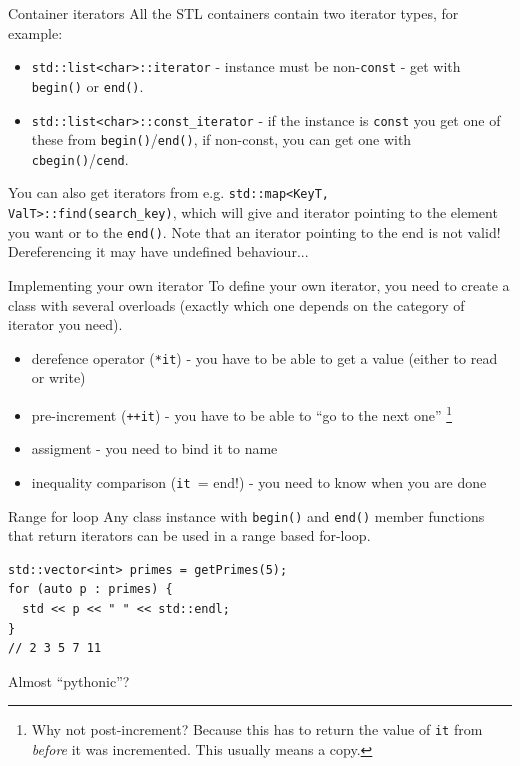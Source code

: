 \documentclass[presentation,t]{beamer}
\newcommand{\code}[1]{\lstinline!#1!}
\begin{document}
\begin{frame}{Container iterators}
  All the STL containers contain two iterator types, for example:
  \begin{itemize}
  \item \code{std::list<char>::iterator} - instance must be
    non-\code{const} - get with \code{begin()} or \code{end()}.
  \item \code{std::list<char>::const_iterator} - if the instance is
    \code{const} you get one of these from
    \code{begin()}/\code{end()}, if non-const, you can get one with \code{cbegin()}/\code{cend}.
  \end{itemize}
  \vfill
  
  You can also get iterators from e.g. \code{std::map<KeyT,
    ValT>::find(search_key)}, which will give and iterator pointing to
  the element you want or to the \code{end()}.
  \vfill
  Note that an iterator pointing to the end is not valid!
  Dereferencing it may have undefined behaviour...
\end{frame}

\begin{frame}{Implementing your own iterator}
  To define your own iterator, you need to create a class with several
  overloads (exactly which one depends on the category of iterator you
  need).
  
  \begin{itemize}
  \item derefence operator (\code{*it}) - you have to be able to get a value
    (either to read or write)
  \item pre-increment (\code{++it}) - you have to be able to ``go to
    the next one'' \footnote{Why not post-increment? Because this has
      to return the value of \code{it} from \emph{before} it was
      incremented. This usually means a copy.}
  \item assigment - you need to bind it to name
  \item inequality comparison (\code{it != end}) - you need to know
    when you are done
  \end{itemize}
\end{frame}

\begin{frame}[fragile]{Range for loop}
  Any class instance with \code{begin()} and \code{end()} member
  functions that return iterators can be used in a range based
  for-loop.
\begin{lstlisting}
std::vector<int> primes = getPrimes(5);
for (auto p : primes) {
  std << p << " " << std::endl;
}
// 2 3 5 7 11 
\end{lstlisting}

Almost ``pythonic''?
\end{frame}
\end{document}
